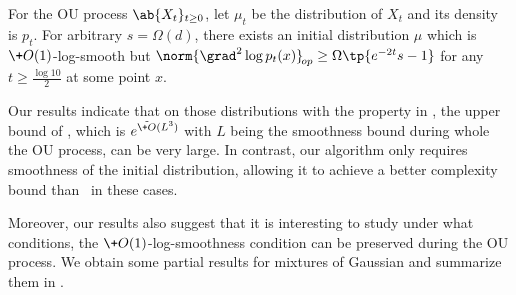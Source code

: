 \documentclass[11pt,a4paper]{article}
\begin{document}

\begin{theorem}\label{thm:main-smooth}
    For the OU process $\ab\{X_t\}_{t\geq 0}$, let $\mu_t$ be the distribution of $X_t$ and its density is $p_t$. For arbitrary $s=\Omega(d)$, there exists an initial distribution $\mu$ which is $\+O(1)$-log-smooth but $\norm{\grad^2 \log p_t(x)}_{\!{op}} \geq \Omega\tp{e^{-2t}s-1}$ for any $t\geq \frac{\log 10}{2}$ at some point $x$.
\end{theorem}
Our results indicate that on those distributions with the property in , the upper bound of \cite{HZD+24}, which is $e^{\tilde{\+O}(L^3)}$ with $L$ being the smoothness bound during whole the OU process, can be very large. In contrast, our algorithm only requires smoothness of the initial distribution, allowing it to achieve a better complexity bound than~\cite{HZD+24} in these cases.

Moreover, our results also suggest that it is interesting to study under what conditions, the $\+O(1)$-log-smoothness condition can be preserved during the OU process. We obtain some partial results for mixtures of Gaussian and summarize them in .

\end{document}
